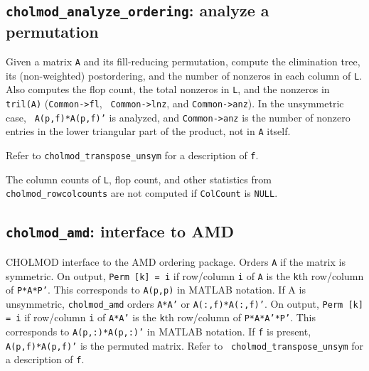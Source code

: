 \documentclass[11pt]{article}
\begin{document}
%

\subsection{{\tt cholmod\_analyze\_ordering}: analyze a permutation}


Given a matrix {\tt A} and its fill-reducing permutation, compute the
elimination tree, its (non-weighted) postordering, and the number of nonzeros
in each column of {\tt L}.  Also computes the flop count, the total nonzeros in
{\tt L}, and the nonzeros in {\tt tril(A)} ({\tt Common->fl}, {\tt
Common->lnz}, and {\tt Common->anz}).  In the unsymmetric case, {\tt
A(p,f)*A(p,f)'} is analyzed, and {\tt Common->anz} is the number of nonzero
entries in the lower triangular part of the product, not in {\tt A} itself.

Refer to {\tt cholmod\_transpose\_unsym} for a description of {\tt f}.

The column counts of {\tt L}, flop count, and other statistics from
{\tt cholmod\_rowcolcounts} are not computed if {\tt ColCount} is {\tt NULL}.

\subsection{{\tt cholmod\_amd}: interface to AMD}


CHOLMOD interface to the AMD ordering package.  Orders {\tt A} if the matrix is
symmetric.  On output, {\tt Perm [k] = i} if row/column {\tt i} of {\tt A} is
the {\tt k}th row/column of {\tt P*A*P'}.  This corresponds to {\tt A(p,p)} in
MATLAB notation.  If A is unsymmetric, {\tt cholmod\_amd} orders {\tt A*A'} or
{\tt A(:,f)*A(:,f)'}.  On output, {\tt Perm [k] = i} if row/column {\tt i} of
{\tt A*A'} is the {\tt k}th row/column of {\tt P*A*A'*P'}.  This corresponds to
{\tt A(p,:)*A(p,:)'} in MATLAB notation.  If {\tt f} is present, {\tt
A(p,f)*A(p,f)'} is the permuted matrix.  Refer to {\tt
cholmod\_transpose\_unsym} for a description of {\tt f}.
\end{document}
